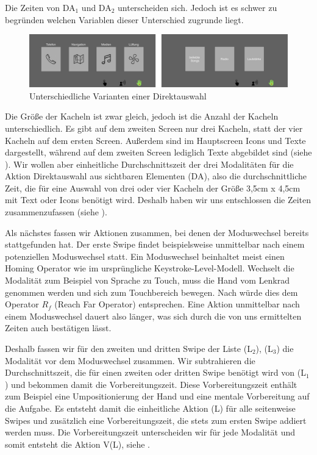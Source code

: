 Die Zeiten von DA$_1$ und DA$_2$ unterscheiden sich.
Jedoch ist es schwer zu begründen welchen Variablen dieser Unterschied zugrunde liegt.
\begin{figure}
	\centering
		\includegraphics[width=1\textwidth]{img/Screen1vsScreen2.JPG}
	\caption{Unterschiedliche Varianten einer Direktauswahl}
	\label{fig:Screen1vsScreen2}
\end{figure}
Die Größe der Kacheln ist zwar gleich, jedoch ist die Anzahl der Kacheln unterschiedlich.
Es gibt auf dem zweiten Screen nur drei Kacheln, statt der vier Kacheln auf dem ersten Screen.
Außerdem sind im Hauptscreen Icons und Texte dargestellt, während auf dem zweiten Screen lediglich Texte abgebildet sind (siehe ).
Wir wollen aber einheitliche Durchschnittszeit der drei Modalitäten für die Aktion Direktauswahl aus sichtbaren Elementen (DA), also die durchschnittliche Zeit, die für eine Auswahl von drei oder vier Kacheln der Größe 3,5cm x 4,5cm mit Text oder Icons benötigt wird.
Deshalb haben wir uns entschlossen die Zeiten zusammenzufassen (siehe ).

Als nächstes fassen wir Aktionen zusammen, bei denen der Moduswechsel bereits stattgefunden hat.
Der erste Swipe findet beispielsweise unmittelbar nach einem potenziellen Moduswechsel statt.
Ein Moduswechsel beinhaltet meist einen Homing Operator wie im ursprüngliche Keystroke-Level-Modell.
Wechselt die Modalität zum Beispiel von Sprache zu Touch, muss die Hand vom Lenkrad genommen werden und sich zum Touchbereich bewegen.
Nach \citet{Green_2002} würde dies dem Operator $R_f$ (Reach Far Operator) entsprechen.
Eine Aktion unmittelbar nach einem Moduswechsel dauert also länger, was sich durch die von uns ermittelten Zeiten auch bestätigen lässt.

Deshalb fassen wir für den zweiten und dritten Swipe der Liste (L$_2$), (L$_3$) die Modalität vor dem Moduswechsel zusammen.
Wir subtrahieren die Durchschnittszeit, die für einen zweiten oder dritten Swipe benötigt wird von (L$_1$) und bekommen damit die Vorbereitungszeit.
Diese Vorbereitungszeit enthält zum Beispiel eine Umpositionierung der Hand und eine mentale Vorbereitung auf die Aufgabe.
Es entsteht damit die einheitliche Aktion (L) für alle seitenweise Swipes und zusätzlich eine Vorbereitungszeit, die stets zum ersten Swipe addiert werden muss.
Die Vorbereitungszeit unterscheiden wir für jede Modalität und somit entsteht die Aktion V(L), siehe .
 
